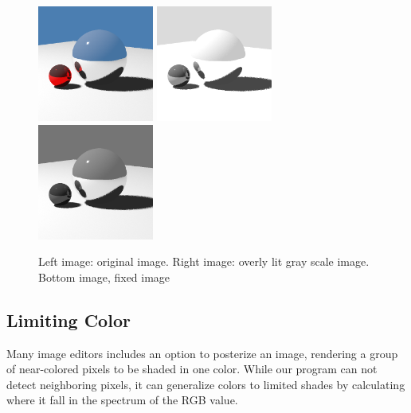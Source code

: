 \documentclass{acmsiggraph}
\begin{document}
\begin{figure}[htp]
\centering
\includegraphics[width=1.5in]{original_color}
\includegraphics[width=1.5in]{overly_lit_gray_scale}
\includegraphics[width=1.5in]{normal_gray_scale}
\caption{Left image: original image. Right image: overly lit gray scale image.
Bottom image, fixed image}
\label{gray_scale}
\end{figure}



\subsection{Limiting Color}
Many image editors includes an option to posterize an image, rendering a group
of near-colored pixels to be shaded in one color.  While our program can not
detect neighboring pixels, it can generalize colors to limited shades by
calculating where it fall in the spectrum of the RGB value.
\end{document}
